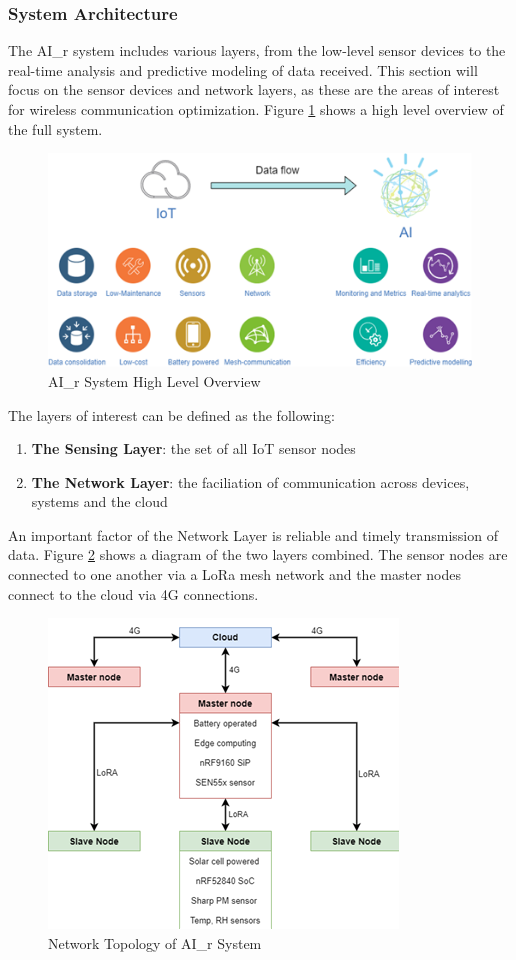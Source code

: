 \documentclass[a4paper,twoside,12pt]{report}
\begin{document}
\subsubsection{System Architecture}
The AI\_r system includes various layers, from the low-level sensor devices to the real-time analysis and predictive modeling of data received. This section will focus on the sensor devices and network layers, as these are the areas of interest for wireless communication optimization. Figure \ref{fig:AQMSystemOverview} shows a high level overview of the full system.

\begin{figure}[ht]
	\centering
	\includegraphics[width=0.5\linewidth]{images/AirQualitySystemOverview.png}
	\caption{AI\_r System High Level Overview}
	\label{fig:AQMSystemOverview}
\end{figure}

The layers of interest can be defined as the following:
\begin{enumerate}
    \item \textbf{The Sensing Layer}: the set of all IoT sensor nodes
    \item \textbf{The Network Layer}: the faciliation of communication across devices, systems and the cloud
\end{enumerate}

An important factor of the Network Layer is reliable and timely transmission of data.
\newline \newline
Figure \ref{fig:NetworkTopology} shows a diagram of the two layers combined. The sensor nodes are connected to one another via a LoRa mesh network and the master nodes connect to the cloud via 4G connections.

\begin{figure}[ht]
	\centering
	\includegraphics[width=0.4\linewidth]{images/Network_topology_of_AI_r_system_cropped.png}
	\caption{Network Topology of AI\_r System}
	\label{fig:NetworkTopology}
\end{figure}
\end{document}
